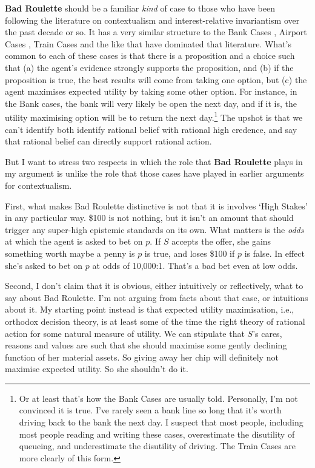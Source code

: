 \textbf{Bad Roulette} should be a familiar \textit{kind} of case to those who have been following the literature on contextualism and interest-relative invariantism over the past decade or so. It has a very similar structure to the Bank Cases \citep{Stanley2005-STAKAP, DeRose2009}, Airport Cases \citep{Cohen1999}, Train Cases \citep{FantlMcGrath2009} and the like that have dominated that literature. What's common to each of these cases is that there is a proposition and a choice such that (a) the agent's evidence strongly supports the proposition, and (b) if the proposition is true, the best results will come from taking one option, but (c) the agent maximises expected utility by taking some other option. For instance, in the Bank cases, the bank will very likely be open the next day, and if it is, the utility maximising option will be to return the next day.\footnote{Or at least that's how the Bank Cases are usually told. Personally, I'm not convinced it is true. I've rarely seen a bank line so long that it's worth driving back to the bank the next day. I suspect that most people, including most people reading and writing these cases, overestimate the disutility of queueing, and underestimate the disutility of driving. The Train Cases are more clearly of this form.} The upshot is that we can't identify both identify rational belief with rational high credence, and say that rational belief can directly support rational action.

But I want to stress two respects in which the role that \textbf{Bad Roulette} plays in my argument is unlike the role that those cases have played in earlier arguments for contextualism. 

First, what makes Bad Roulette distinctive is not that it is involves `High Stakes' in any particular way. \$100 is not nothing, but it isn't an amount that should trigger any super-high epistemic standards on its own. What matters is the \textit{odds} at which the agent is asked to bet on \(p\). If \(S\) accepts the offer, she gains something worth maybe a penny is \(p\) is true, and loses \$100 if \(p\) is false. In effect she's asked to bet on \(p\) at odds of 10,000:1. That's a bad bet even at low odds.

Second, I don't claim that it is obvious, either intuitively or reflectively, what to say about Bad Roulette. I'm not arguing from facts about that case, or intuitions about it. My starting point instead is that expected utility maximisation, i.e., orthodox decision theory, is at least some of the time the right theory of rational action for some natural measure of utility. We can stipulate that \(S\)'s cares, reasons and values are such that she should maximise some gently declining function of her material assets. So giving away her chip will definitely not maximise expected utility. So she shouldn't do it.

